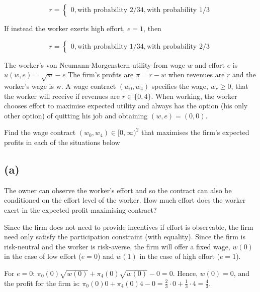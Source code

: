 \documentclass{article}
\begin{document}
\begin{equation}
r =
    \begin{cases}
0, \text{with probability 2/3}
4, \text{with probability 1/3}
    \end{cases}
\nonumber
\end{equation}
	

If instead the worker exerts high effort, $e = 1$, then

\begin{equation}
r =
    \begin{cases}
0, \text{with probability 1/3}
4, \text{with probability 2/3}
    \end{cases}
\nonumber
\end{equation}


The worker's von Neumann-Morgenstern utility from wage $w$ and effort $e$ is $u(w, e) = \sqrt{w} -e$
The firm's profits are $\pi = r - w$ when revenues are $r$ and the worker's wage is w. A wage contract
$(w_0, w_4)$ specifies the wage, $w_r \ge 0$, that the worker will receive if revenues are $r \in \{0, 4\}$. When
working, the worker chooses effort to maximise expected utility and always has the option (his only
other option) of quitting his job and obtaining $(w, e) = (0, 0)$.

Find the wage contract $(w_0, w_4) \in [0,\infty)^2$ that maximises the firm's expected profits in each
of the situations below



\subsection*{(a)}The owner can observe the worker’s effort and so the contract can also be conditioned
on the effort level of the worker. How much effort does the worker exert in the expected
profit-maximising contract?

\bigskip

Since the firm does not need to provide incentives if effort is observable, the firm need only satisfy the participation constraint (with equality). Since the firm is risk-neutral and the worker is risk-averse, the firm will offer a fixed wage, $w(0)$ in the case of low effort ($e=0$) and $w(1)$ in the case of high effort ($e=1$).

For $e=0$: $\pi_0(0)\sqrt{w(0)} + \pi_4(0)\sqrt{w(0)} - 0 = 0$. Hence, $w(0) = 0$, and the profit for the firm is: $\pi_0(0)0 + \pi_4(0)4 - 0 = \tfrac23 \cdot 0 + \tfrac13 \cdot 4 = \tfrac43$.
\end{document}
